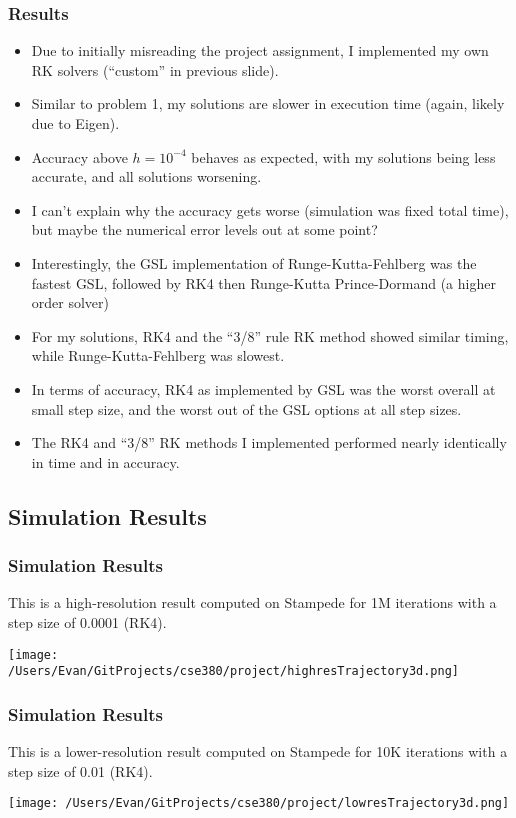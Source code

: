 \documentclass{beamer}
\begin{document}
\begin{frame}[allowframebreaks]
\frametitle{Results}
\begin{itemize}
\item Due to initially misreading the project assignment, I implemented my own RK solvers (``custom'' in previous slide).
\item Similar to problem 1, my solutions are slower in execution time (again, likely due to Eigen).
\item Accuracy above $h=10^{-4}$ behaves as expected, with my solutions being less accurate, and all solutions worsening.
\item I can't explain why the accuracy gets worse (simulation was fixed total time), but maybe the numerical error levels out at some point?
\item Interestingly, the GSL implementation of Runge-Kutta-Fehlberg was the fastest GSL, followed by RK4 then Runge-Kutta Prince-Dormand (a higher order solver)
\item For my solutions, RK4 and the ``3/8'' rule RK method showed similar timing, while Runge-Kutta-Fehlberg was slowest.
\item In terms of accuracy, RK4 as implemented by GSL was the worst overall at small step size, and the worst out of the GSL options at all step sizes.
\item The RK4 and ``3/8'' RK methods I implemented performed nearly identically in time and in accuracy.
\end{itemize}
\end{frame}

\subsection{Simulation Results}
\begin{frame}
\frametitle{Simulation Results}
This is a high-resolution result computed on Stampede for 1M iterations with a step size of 0.0001 (RK4).

\texttt{[image: /Users/Evan/GitProjects/cse380/project/highresTrajectory3d.png]}
\end{frame}

\begin{frame}
\frametitle{Simulation Results}
This is a lower-resolution result computed on Stampede for 10K iterations with a step size of 0.01 (RK4).

\texttt{[image: /Users/Evan/GitProjects/cse380/project/lowresTrajectory3d.png]}
\end{frame}
\end{document}

